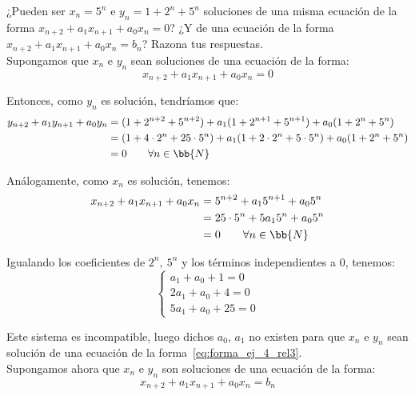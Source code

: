 \begin{ejercicio}
    ¿Pueden ser $x_n = 5^n$ e $y_n = 1 + 2^n + 5^n$ soluciones de una misma ecuación de la forma $x_{n+2} + a_1 x_{n+1} + a_0 x_n = 0$?
    ¿Y de una ecuación de la forma $x_{n+2} + a_1 x_{n+1} + a_0 x_n = b_n$? Razona tus respuestas.\\

    Supongamos que $x_n$ e $y_n$ sean soluciones de una ecuación de la forma:
    \begin{equation}\label{eq:forma_ej_4_rel3}
        x_{n+2} + a_1 x_{n+1} + a_0 x_n = 0
    \end{equation}

    Entonces, como $y_n$ es solución, tendríamos que:
    \begin{align*}
        y_{n+2} + a_1 y_{n+1} + a_0 y_n &= (1+2^{n+2}+5^{n+2}) + a_1(1+2^{n+1}+5^{n+1}) + a_0 (1+2^{n}+5^{n}) \\
        &= (1+4\cdot 2^n + 25\cdot 5^n) + a_1(1+2\cdot 2^n + 5\cdot 5^n) + a_0 (1 + 2^n + 5^n) \\
        &= 0\qquad \forall n \in \bb{N}
    \end{align*}
    
    Análogamente, como $x_n$ es solución, tenemos:
    \begin{align*}
        x_{n+2} + a_1 x_{n+1} + a_0 x_n &= 5^{n+2} + a_15^{n+1} + a_05^n \\
        &= 25\cdot 5^n + 5a_15^n + a_0 5^n \\
        &= 0 \qquad \forall n \in \bb{N}
    \end{align*}
    
    Igualando los coeficientes de $2^n,~5^n$ y los términos independientes a $0$, tenemos:
    \begin{equation*}
        \left\{\begin{array}{l}
            a_1 + a_0 + 1 = 0 \\
            2a_1 + a_0 + 4 = 0 \\
            5a_1 + a_0 + 25 = 0 
        \end{array}\right.
    \end{equation*}

    Este sistema es incompatible, luego dichos $a_0$, $a_1$ no existen para que $x_n$ e $y_n$ sean solución de una ecuación de la forma~\ref{eq:forma_ej_4_rel3}.\\

    Supongamos ahora que $x_n$ e $y_n$ son soluciones de una ecuación de la forma:
    \begin{equation}\label{eq:forma_ej_4_rel3_2}
        x_{n+2} + a_1 x_{n+1} + a_0 x_n = b_n
    \end{equation}


\end{ejercicio}
